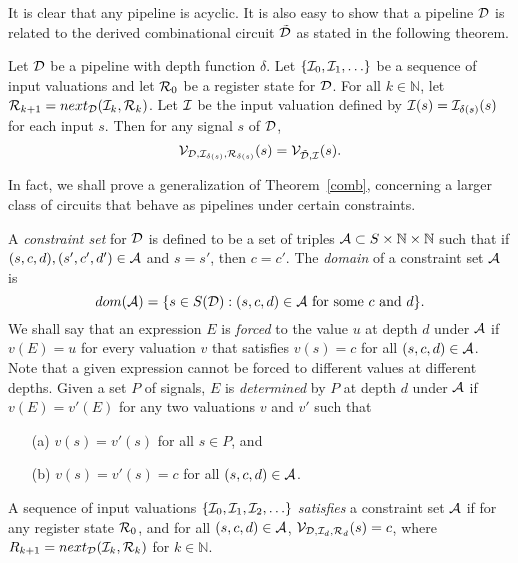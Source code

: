 \documentclass{article}
\begin{document}
It is clear that any pipeline is acyclic.  It is also easy to show
that a pipeline ${\cal D}$ is related to the derived combinational
circuit $\tilde{\cal D}$ as stated in the following theorem.

\begin{theorem}\label{comb}
Let ${\cal D}$ be a pipeline with depth function $\delta$.  Let
$\{{\cal I}_0,{\cal I}_1,\ldots\}$ be a sequence of input valuations
and let ${\cal R}_0$ be a register state for ${\cal D}$.  For all
$k \in {\mathbb N}$, let ${\cal R}_{k+1} = next_{\cal D}({\cal I}_k,{\cal
R}_k)$.  Let ${\cal I}$ be the input valuation defined by ${\cal I}(s)
= {\cal I}_{\delta(s)}(s)$ for each input $s$.  Then for any signal
$s$ of ${\cal D}$,
\[{\cal V}_{{\cal D},{\cal I}_{\delta(s)},{\cal R}_{\delta(s)}}(s) = 
{\cal V}_{\tilde{\cal D},{\cal I}}(s).\]
\end{theorem}
In fact, we shall prove a generalization of Theorem~\ref{comb},
concerning a larger class of circuits that behave as pipelines under
certain constraints.

A {\it constraint set} for ${\cal D}$ is defined to be a set of
triples ${\cal A} \subset S \times {\mathbb N} \times {\mathbb N}$
such that if $(s,c,d), (s',c',d') \in {\cal A}$ and $s = s'$, then $c
= c'$.  The {\it domain} of a constraint set ${\cal A}$ is
\[dom({\cal A}) = \{s \in S({\cal D}) : (s,c,d) \in {\cal A} \mbox{ for some $c$ and $d$}\}.\]
We shall say that an expression $E$ is {\it forced} to the value $u$
at depth $d$ under ${\cal A}$ if $v(E) = u$ for every valuation $v$
that satisfies $v(s) = c$ for all $(s,c,d) \in {\cal A}$.  Note that a
given expression cannot be forced to different values at different
depths.  Given a set $P$ of signals, $E$ is {\it determined} by $P$ at
depth $d$ under ${\cal A}$ if $v(E) = v'(E)$ for any two valuations
$v$ and $v'$ such that

\begin{itemize}

\item[(a)] $v(s) = v'(s)$ for all $s \in P$, and

\item[(b)] $v(s) = v'(s) = c$ for all $(s,c,d) \in {\cal A}$.

\end{itemize}

A sequence of input valuations $\{{\cal I}_0,{\cal I}_1,{\cal
I}_2,\ldots\}$ {\it satisfies} a constraint set ${\cal A}$ if for any
register state ${\cal R}_0$, and for all $(s,c,d) \in {\cal A}$,
${\cal V}_{{\cal D},{\cal I}_d,{\cal R}_d}(s) = c$, where $R_{k+1} =
next_{\cal D}({\cal I}_k,{\cal R}_k)$ for $k \in {\mathbb N}$.  
\end{document}
